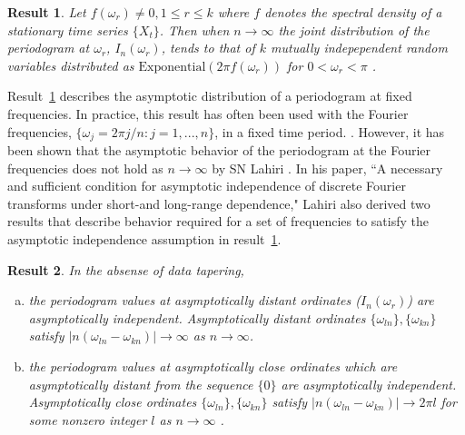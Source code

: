 \documentclass{article}\usepackage{graphicx, color}
\theoremstyle{plain}
\newtheorem{res}{Result}
\begin{document}
\begin{res} \label{res:first}
Let $f(\omega_r) \not= 0, 1 \le r \le k$ where $f$ denotes the spectral density of a stationary time series $\{X_t\}$. Then when $n\rightarrow \infty$ the joint distribution of the periodogram at $\omega_r$, $I_n(\omega_r)$, tends to that of $k$ mutually indepependent random variables distributed as $\text{Exponential}(2\pi f(\omega_r))$ for $0<\omega_r<\pi$ \cite{brockwell2002introduction}. 
\end{res}

Result~\ref{res:first} describes the asymptotic distribution of a periodogram at fixed frequencies. In practice, this result has often been used with the Fourier frequencies, $\{\omega_j = 2\pi j/n : j=1,...,n\}$, in a fixed time period. \cite{brockwell2002introduction}. However, it has been shown that the asymptotic behavior of the periodogram at the Fourier frequencies does not hold as $n \rightarrow \infty$ by SN Lahiri \cite{lahiri2003necessary}. In his paper, ``A necessary and sufficient condition for asymptotic independence of discrete Fourier transforms under short-and long-range dependence," Lahiri also derived two results that describe behavior required for a set of frequencies to satisfy the asymptotic independence assumption in result~\ref{res:first}.

\begin{res} \label{res:lahiri}
In the absense of data tapering,
\begin{enumerate}[(a)]
\item the periodogram values at asymptotically distant ordinates ($I_n(\omega_r)$) are asymptotically independent.  Asymptotically distant ordinates $\{\omega_{ln}\}, \{\omega_{kn}\}$ satisfy $|n(\omega_{ln} - \omega_{kn})| \rightarrow \infty$ as $n \rightarrow \infty$.

\item the periodogram values at asymptotically close ordinates which are asymptotically distant from the sequence $\{0\}$ are asymptotically independent. Asymptotically close ordinates $\{\omega_{ln}\}, \{\omega_{kn}\}$ satisfy $|n(\omega_{ln} - \omega_{kn})| \rightarrow 2\pi l$ for some nonzero integer $l$ as $n \rightarrow \infty$ \cite{lahiri2003necessary}.
\end{enumerate}
\end{res}

\end{document}
